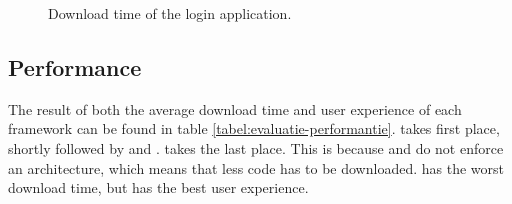 \documentclass[a4paper]{artikel3}
\begin{document}
\begin{figure}[t]
  \centering
  \quad
  \caption{Download time of the login application.}
  \label{fig:performantie-login-boxplot}
\end{figure}
  

\subsection{Performance} %
\label{sec:evaluation-performance}
The result of both the average download time and user experience of each framework can be found in table \ref{tabel:evaluatie-performantie}.
\lungo{} takes first place, shortly followed by \jqma{} and \sta{}.
\kendoa{} takes the last place.
This is because \lungo{} and \jqma{} do not enforce an architecture, which means that less \js{} code has to be downloaded.
\sta{} has the worst download time, but has the best user experience.
\end{document}

